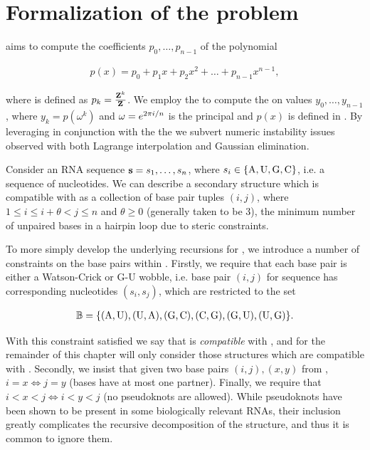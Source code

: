 \section{Formalization of the problem}
\label{sec:fftbor:formal}

\fftbor aims to compute the coefficients $p_0,\dots,p_{n-1}$ of the polynomial

\begin{align}
\label{eq:fftbor:pOfX}
p(x) = p_0 + p_1 x + p_2 x^2 + \dots + p_{n-1} x^{n-1},
\end{align}

where \pk is defined as $p_k = \frac{{\bf Z}^{k}_{}}{{\bf Z}^{}_{}}$. We employ the \fft to compute
the \idft on values $y_0,\dots,y_{n-1}$, where
$y_k = p(\omega^k)$ and $\omega = e^{2 \pi i/n}$ is the principal \nRoU and $p(x)$ is defined in
. By leveraging
\nRoUs in conjunction with the \idft the we subvert numeric instability
issues observed with both Lagrange interpolation and Gaussian elimination.

Consider an RNA sequence ${\bf s} = s_1,\dots,s_n$, where
$s_i \in \{\text{A,\,U,\,G,\,C}\}$, i.e. a sequence of nucleotides. We can describe a
secondary structure \str which is compatible with \seq as a collection of
base pair tuples $(i,j)$, where $1 \le i \le i+\theta < j \le n$ and
$\theta \ge 0$ (generally taken to be 3), the minimum number of unpaired bases
in a hairpin loop due to steric constraints.

To more simply develop the underlying recursions for \fftbor, we introduce a
number of constraints on the base pairs within \str. Firstly, we require that
each base pair is either a Watson-Crick or G-U wobble, i.e. base pair $(i,j)$
for sequence \seq has corresponding nucleotides $(s_i,s_j)$, which are
restricted to the set

\begin{align}
\label{eq:fftbor:validBP}
\bpSet =
\{\text{(A,\,U),\,(U,\,A),\,(G,\,C),\,(C,\,G),\,(G,\,U),\,(U,\,G)}\}.
\end{align}

With
this constraint satisfied we say that \str is {\em compatible} with \seq, and
for the remainder of this chapter will only consider those structures which are
compatible with \seq.
Secondly, we insist that given two base pairs $(i,j), (x,y)$ from \str,
$i=x \iff j=y$ (bases have at most one partner). Finally, we require that
$i<x<j \iff i<y<j$ (no pseudoknots are allowed). While pseudoknots have been
shown to be present in some biologically relevant RNAs, their inclusion greatly
complicates the recursive decomposition of the structure, and thus it is common
to ignore them.

